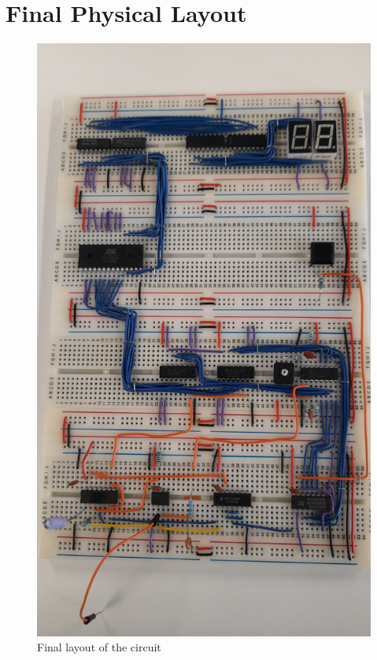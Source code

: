 \chapter{Final Physical Layout}
\begin{figure}[H]
    \centering
    \includegraphics[width=\textwidth, angle=270 ]{images/finalLayout.jpg}
    \caption{Final layout of the circuit}
    \label{fig:finalLayout}
\end{figure}




